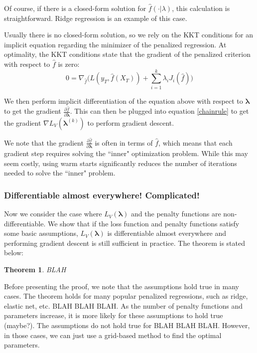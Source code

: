 \documentclass[10pt,letterpaper]{article}
\newtheorem{theorem}{Theorem}
\begin{document}
Of course, if there is a closed-form solution for $\hat f(\cdot | \lambda)$, this calculation is straightforward. Ridge regression is an example of this case.

Usually there is no closed-form solution, so we rely on the KKT conditions for an implicit equation regarding the minimizer of the penalized regression. At optimality, the KKT conditions state that the gradient of the penalized criterion with respect to $\hat f$ is zero:
\begin{equation}
0 = \nabla_{\hat f} \bigg(L(y_T, \hat f (X_T)) + \sum\limits_{i=1}^k \lambda_i J_i(\hat f) \bigg)
\label{eq:kktgradient}
\end{equation}

We then perform implicit differentiation of the equation above with respect to $\boldsymbol{\lambda}$ to get the gradient $\frac{\partial \hat f}{\partial \boldsymbol{\lambda}}$. This can then be plugged into equation \ref{chainrule} to get the gradient $\nabla{L_V}(\boldsymbol{\lambda}^{(k)})$ to perform gradient descent.

We note that the gradient $\frac{\partial \hat f}{\partial \boldsymbol{\lambda}}$ is often in terms of $\hat f$, which means that each gradient step requires solving the ``inner" optimization problem. While this may seem costly, using warm starts significantly reduces the number of iterations needed to solve the ``inner" problem.

\subsubsection{Differentiable almost everywhere! Complicated!}

Now we consider the case where $L_V(\boldsymbol{\lambda})$ and the penalty functions are non-differentiable. We show that if the loss function and penalty functions satisfy some basic assumptions, $L_V(\boldsymbol{\lambda})$ is differentiable almost everywhere and performing gradient descent is still sufficient in practice. The theorem is stated below:

\begin{theorem}
BLAH
\end{theorem}

Before presenting the proof, we note that the assumptions hold true in many cases. The theorem holds for many popular penalized regressions, such as ridge, elastic net, etc. BLAH BLAH BLAH. As the number of penalty functions and parameters increase, it is more likely for these assumptions to hold true (maybe?). The assumptions do not hold true for BLAH BLAH BLAH. However, in those cases, we can just use a grid-based method to find the optimal parameters.
\end{document}
